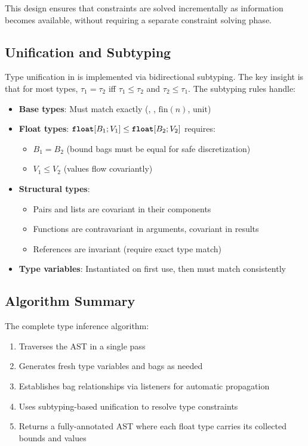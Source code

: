 This design ensures that constraints are solved incrementally as information becomes available, without requiring a separate constraint solving phase.

\subsection{Unification and Subtyping}

Type unification in \Slice{} is implemented via bidirectional subtyping. The key insight is that for most types, $\tau_1 = \tau_2$ iff $\tau_1 \leq \tau_2$ and $\tau_2 \leq \tau_1$. The subtyping rules handle:

\begin{itemize}
    \item \textbf{Base types}: Must match exactly (\bool{}, \intty{}, $\text{fin}(n)$, $\text{unit}$)
    \item \textbf{Float types}: $\text{\ttfamily\bfseries float}[B_1; V_1] \leq \text{\ttfamily\bfseries float}[B_2; V_2]$ requires:
        \begin{itemize}
            \item $B_1 = B_2$ (bound bags must be equal for safe discretization)
            \item $V_1 \leq V_2$ (values flow covariantly)
        \end{itemize}
    \item \textbf{Structural types}: 
        \begin{itemize}
            \item Pairs and lists are covariant in their components
            \item Functions are contravariant in arguments, covariant in results
            \item References are invariant (require exact type match)
        \end{itemize}
    \item \textbf{Type variables}: Instantiated on first use, then must match consistently
\end{itemize}

\subsection{Algorithm Summary}

The complete type inference algorithm:
\begin{enumerate}
    \item Traverses the AST in a single pass
    \item Generates fresh type variables and bags as needed
    \item Establishes bag relationships via listeners for automatic propagation
    \item Uses subtyping-based unification to resolve type constraints
    \item Returns a fully-annotated AST where each float type carries its collected bounds and values
\end{enumerate}

